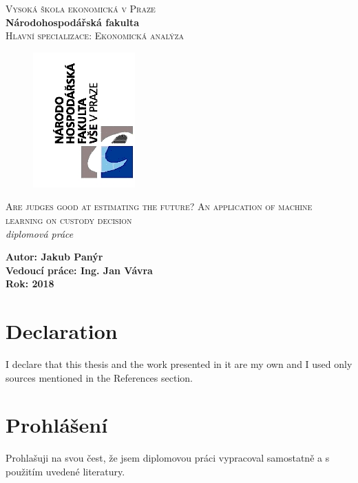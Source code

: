 \documentclass[12pt, twoside,openany]{book} %
\begin{document}
\begin{titlepage}   %
\centering
\begin{center}
\textsc{ Vysoká škola ekonomická v Praze}\\[20pt]
\textbf{Národohospodářská fakulta}\\[20pt]
\textsc{Hlavní specializace: Ekonomická analýza}\\[14pt]

\begin{figure}[h]
  \centering
  \includegraphics{obr1_nf_logo}
\end{figure}

\textsc{Are judges good at estimating the future? An application of machine learning on custody decision}\\[24pt]
\textit{diplomová práce}\\[19pt]
\vspace*{\fill}

\begin{flushleft}
\textbf{Autor: Jakub Panýr}\\[17pt] 
\textbf{Vedoucí práce:  Ing. Jan Vávra}\\[17pt]  
\textbf{Rok: 2018}\\[17pt] 
\end{flushleft}

\end{center}
\end{titlepage}

\pagestyle{empty}     %
\clearpage\mbox{}\clearpage


\section*{Declaration}      %
\noindent
I declare that this thesis and the work presented in it are my own and I used only sources mentioned in the References section.

\section*{Prohlášení}
\noindent 
Prohlašuji na svou čest, že jsem diplomovou práci vypracoval samostatně a s použitím 
uvedené literatury.
\end{document}
